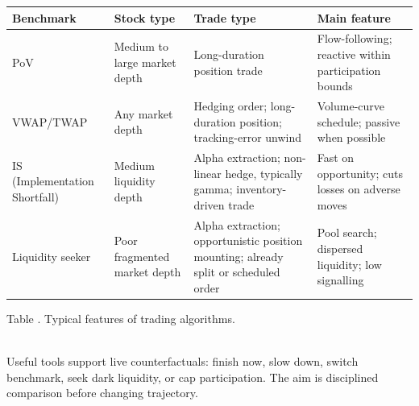 \documentclass[a4paper,oneside,openany]{book}
\begin{document}
\begin{table}[htbp]
\centering
\scriptsize
{}
\renewcommand{\arraystretch}{1.14}
\setlength{\tabcolsep}{4pt}
\begin{tabularx}{\textwidth}{@{}>{\RaggedRight\arraybackslash}p{} >{\RaggedRight\arraybackslash}p{} >{\RaggedRight\arraybackslash}p{} >{\RaggedRight\arraybackslash}X@{}}
\hline
\textbf{Benchmark} & \textbf{Stock type} & \textbf{Trade type} & \textbf{Main feature} \\
\hline
PoV & Medium to large market depth & Long-duration position trade & Flow-following; reactive within participation bounds \\
VWAP/TWAP & Any market depth & Hedging order; long-duration position; tracking-error unwind & Volume-curve schedule; passive when possible \\
IS (Implementation Shortfall) & Medium liquidity depth & Alpha extraction; non-linear hedge, typically gamma; inventory-driven trade & Fast on opportunity; cuts losses on adverse moves \\
Liquidity seeker & Poor fragmented market depth & Alpha extraction; opportunistic position mounting; already split or scheduled order & Pool search; dispersed liquidity; low signalling \\
\hline
\end{tabularx}

\vspace{0.25em}
{\footnotesize Table \thetable. Typical features of trading algorithms.}
\end{table}

\begin{practitionernote} \\
Useful tools support live counterfactuals: finish now, slow down, switch benchmark, seek dark liquidity, or cap participation. The aim is disciplined comparison before changing trajectory.
\end{practitionernote}
\end{document}
